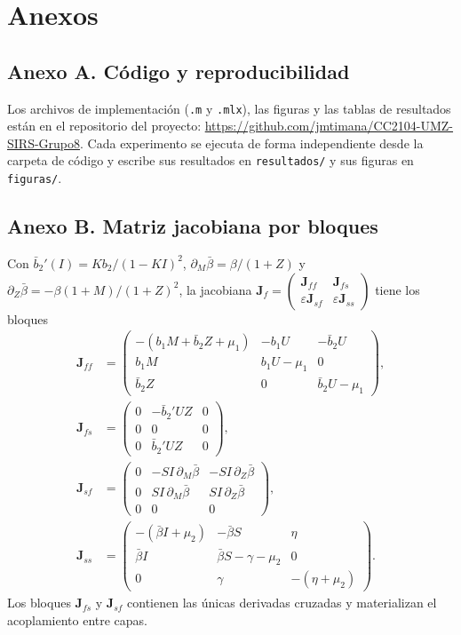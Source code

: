 \clearpage
\appendix
\section*{Anexos}
\subsection*{Anexo A. Código y reproducibilidad}
Los archivos de implementación (\texttt{.m} y \texttt{.mlx}), las figuras y las tablas de resultados están en el repositorio del proyecto: \url{https://github.com/jmtimana/CC2104-UMZ-SIRS-Grupo8}. Cada experimento se ejecuta de forma independiente desde la carpeta de código y escribe sus resultados en \texttt{resultados/} y sus figuras en \texttt{figuras/}.

\subsection*{Anexo B. Matriz jacobiana por bloques}\label{anx:jacobiana}
Con $\bar b_2'(I)=Kb_2/(1-KI)^2$, $\partial_M\bar\beta=\beta/(1+Z)$ y $\partial_Z\bar\beta=-\beta(1+M)/(1+Z)^2$, la jacobiana $\mathbf J_f=\begin{pmatrix}\mathbf J_{ff}&\mathbf J_{fs}\\ \varepsilon\mathbf J_{sf}&\varepsilon\mathbf J_{ss}\end{pmatrix}$ tiene los bloques
\begin{align*}
\mathbf J_{ff}&=\begin{pmatrix}-(b_1M+\bar b_2Z+\mu_1)&-b_1U&-\bar b_2U\\ b_1M&b_1U-\mu_1&0\\ \bar b_2Z&0&\bar b_2U-\mu_1\end{pmatrix},\\
\mathbf J_{fs}&=\begin{pmatrix}0&-\bar b_2'UZ&0\\0&0&0\\0&\bar b_2'UZ&0\end{pmatrix},\\
\mathbf J_{sf}&=\begin{pmatrix}0&-SI\,\partial_M\bar\beta&-SI\,\partial_Z\bar\beta\\0&SI\,\partial_M\bar\beta&SI\,\partial_Z\bar\beta\\0&0&0\end{pmatrix},\\
\mathbf J_{ss}&=\begin{pmatrix}-(\bar\beta I+\mu_2)&-\bar\beta S&\eta\\ \bar\beta I&\bar\beta S-\gamma-\mu_2&0\\0&\gamma&-(\eta+\mu_2)\end{pmatrix}.
\end{align*}
Los bloques $\mathbf J_{fs}$ y $\mathbf J_{sf}$ contienen las únicas derivadas cruzadas y materializan el acoplamiento entre capas.

